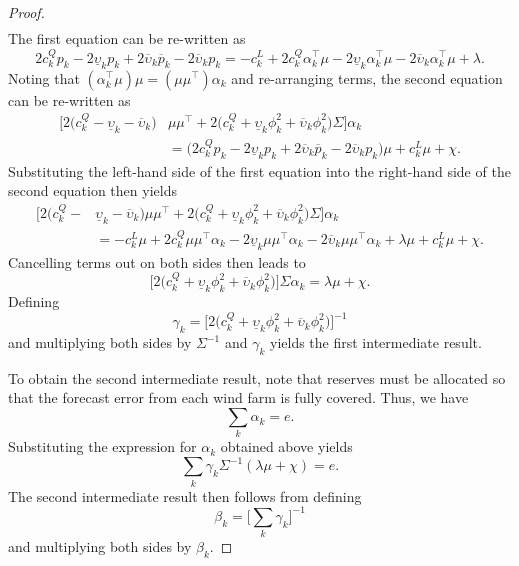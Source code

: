 \documentclass{article}
\begin{document}
\begin{proof}
\begin{align*}
\end{align*}
The first equation can be re-written as
\begin{equation*}
2c_k^Q p_k - 2 \underline{\upsilon}_k p_k + 2 \overline{\upsilon}_k \overline{p}_k - 2 \overline{\upsilon}_k p_k = -c_k^L + 2 c_k^Q \alpha_k^\top \mu - 2 \underline{\upsilon}_k \alpha_k^\top \mu - 2 \overline{\upsilon}_k \alpha_k^\top \mu + \lambda.
\end{equation*}
Noting that $(\alpha_k^\top \mu) \mu = (\mu \mu^\top) \alpha_k$ and re-arranging terms, the second equation can be re-written as
\begin{align*}
\bigg[2 \Big(c_k^Q - \underline{\upsilon}_k - \overline{\upsilon}_k\Big)& \mu \mu^\top + 2\Big(c_k^Q + \underline{\upsilon}_k \phi_k^2 + \overline{\upsilon}_k \phi_k^2\Big) \Sigma \bigg]\alpha_k\\
&= \big(2c_k^Q p_k - 2 \underline{\upsilon}_k p_k + 2 \overline{\upsilon}_k \overline{p}_k - 2 \overline{\upsilon}_k p_k\big) \mu + c_k^L \mu + \chi.
\end{align*}
Substituting the left-hand side of the first equation into the right-hand side of the second equation then yields
\begin{align*}
\bigg[2 \Big(c_k^Q -& \underline{\upsilon}_k - \overline{\upsilon}_k\Big) \mu \mu^\top + 2\Big(c_k^Q + \underline{\upsilon}_k \phi_k^2 + \overline{\upsilon}_k \phi_k^2\Big) \Sigma \bigg]\alpha_k\\
&= -c_k^L \mu + 2 c_k^Q \mu \mu^\top \alpha_k - 2 \underline{\upsilon}_k \mu \mu^\top \alpha_k - 2 \overline{\upsilon}_k \mu \mu^\top \alpha_k + \lambda \mu + c_k^L \mu + \chi.
\end{align*}
Cancelling terms out on both sides then leads to
\begin{equation*}
\bigg[2\Big(c_k^Q + \underline{\upsilon}_k \phi_k^2 + \overline{\upsilon}_k \phi_k^2\Big) \bigg] \Sigma \alpha_k = \lambda \mu + \chi.
\end{equation*}
Defining 
\begin{equation*}
\gamma_k = \bigg[2\Big(c_k^Q + \underline{\upsilon}_k \phi_k^2 + \overline{\upsilon}_k \phi_k^2\Big) \bigg]^{-1}
\end{equation*}
and multiplying both sides by $\Sigma^{-1}$ and $\gamma_k$ yields the first intermediate result. 

To obtain the second intermediate result, note that reserves must be allocated so that the forecast error from each wind farm is fully covered. Thus, we have
\begin{equation*}
\sum_k \alpha_k = e.
\end{equation*}
Substituting the expression for $\alpha_k$ obtained above yields
\begin{equation*}
\sum_k \gamma_k \Sigma^{-1} (\lambda \mu + \chi) = e.
\end{equation*}
The second intermediate result then follows from defining
\begin{equation*}
\beta_k = \bigg[\sum_k \gamma_k\bigg]^{-1}
\end{equation*}
and multiplying both sides by $\beta_k$.


\end{proof}
\end{document}
